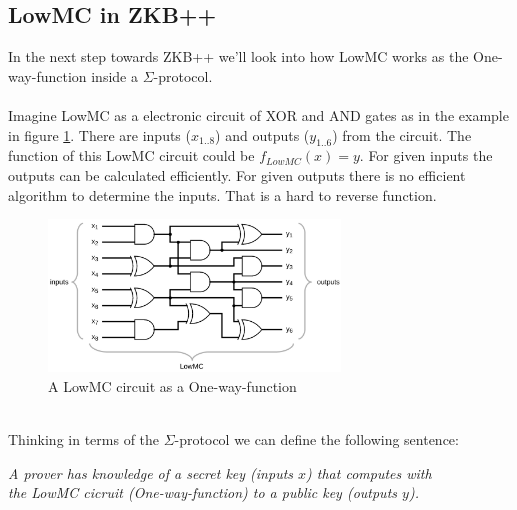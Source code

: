 \documentclass[]{article}
\begin{document}
\subsection{LowMC in ZKB++}
In the next step towards ZKB++ we'll look into how LowMC works as the One-way-function inside a $\Sigma$-protocol.\\ \\
Imagine LowMC as a electronic circuit of XOR and AND gates as in the example in figure \ref{fig:circuit}. There are inputs ($x_{1..8}$) and outputs ($y_{1..6}$) from the circuit. The function of this LowMC circuit could be $f_{LowMC}(x) = y$. For given inputs the outputs can be calculated efficiently. For given outputs there is no efficient algorithm to determine the inputs. That is a hard to reverse function.\\
\begin{figure}[htbp]
\center
\includegraphics[width=0.69\textwidth]{pics/circuit.pdf}
\caption{A LowMC circuit as a One-way-function}
\label{fig:circuit}
\end{figure}\\
Thinking in terms of the $\Sigma$-protocol we can define the following sentence:
\begin{center}
\textit{A prover has knowledge of a secret key (inputs $x$) that computes with\\
the LowMC cicruit (One-way-function) to a public key (outputs $y$).}
\end{center}
\end{document}
